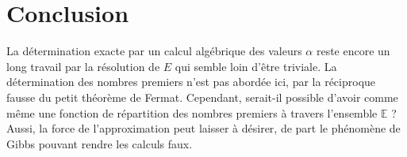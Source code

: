 \documentclass{article}
\begin{document}
\section{Conclusion}
La détermination exacte par un calcul algébrique des valeurs $\alpha$ reste encore un long travail par la résolution de $E$ qui semble loin d'être triviale. La détermination des nombres premiers n'est pas abordée ici, par la réciproque fausse du petit théorème de Fermat. Cependant, serait-il possible d'avoir comme même une fonction de répartition des nombres premiers à travers l'ensemble $\mathbb{E}$ ? Aussi, la force de l'approximation peut laisser à désirer, de part le phénomène de Gibbs pouvant rendre les calculs faux.
\end{document}
